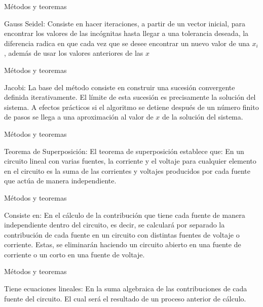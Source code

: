 \documentclass[11pt]{beamer}
\begin{document}
      \begin{frame}{Métodos y teoremas}
\begin{block}{Gauss Seidel:}
\justifying
Consiste en hacer iteraciones, a partir de un vector inicial, para encontrar los valores de las incógnitas hasta llegar a una tolerancia deseada, la diferencia radica en que cada vez que se desee encontrar un nuevo valor de una $x_i$, además de usar los valores anteriores de las $x$
\end{block}
      \end{frame}
      
      \begin{frame}{Métodos y teoremas}
\begin{block}{Jacobi:}
\justifying
La base del método consiste en construir una sucesión convergente definida iterativamente. El límite de esta sucesión es precisamente la solución del sistema. A efectos prácticos si el algoritmo se detiene después de un número finito de pasos se llega a una aproximación al valor de $x$ de la solución del sistema.
\end{block}
      \end{frame}
      
      \begin{frame}{Métodos y teoremas}
\begin{block}{Teorema de Superposición:}
\justifying
El teorema de superposición establece que:
En un circuito lineal con varias fuentes, la corriente y el voltaje para cualquier elemento en el circuito es la suma de las corrientes y voltajes producidos por cada fuente que actúa de manera independiente.
\end{block}
      \end{frame}
      
       \begin{frame}{Métodos y teoremas}
\begin{block}{Consiste en:}
\justifying
En el cálculo de la contribución que tiene cada fuente de manera independiente dentro del circuito, es decir, se calculará por separado la contribución de cada fuente en un circuito con distintas fuentes de voltaje o corriente. Estas, se eliminarán haciendo un circuito abierto en una fuente de corriente o un corto en una fuente de voltaje.
\end{block}
      \end{frame}
      
       \begin{frame}{Métodos y teoremas}
\begin{block}{Tiene ecuaciones lineales:}
\justifying
En la suma algebraica de las contribuciones de cada fuente del circuito. El cual será el resultado de un proceso anterior de cálculo.
\end{block}
      \end{frame}
      
\end{document}
